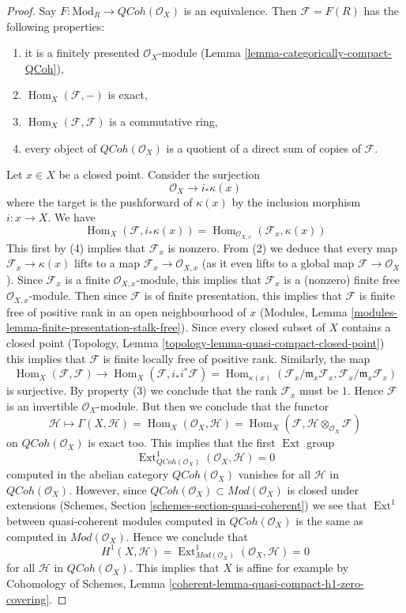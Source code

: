 \documentclass[10pt,a4paper]{amsart}
\theoremstyle{plain}
\theoremstyle{definition}
\theoremstyle{remark}
\numberwithin{equation}{subsection}
\def\Hom{\mathop{\mathrm{Hom}}\nolimits}
\def\Ext{\mathop{\mathrm{Ext}}\nolimits}
\def\QCoh{\mathit{QCoh}}
\begin{document}
\begin{proof}
Say $F : \text{Mod}_R \to \QCoh(\mathcal{O}_X)$ is an equivalence.
Then $\mathcal{F} = F(R)$ has the following properties:
\begin{enumerate}
\item it is a finitely presented $\mathcal{O}_X$-module
(Lemma \ref{lemma-categorically-compact-QCoh}),
\item $\Hom_X(\mathcal{F}, -)$ is exact,
\item $\Hom_X(\mathcal{F}, \mathcal{F})$ is a commutative ring,
\item every object of $\QCoh(\mathcal{O}_X)$ is a quotient of
a direct sum of copies of $\mathcal{F}$.
\end{enumerate}
Let $x \in X$ be a closed point. Consider the surjection
$$
\mathcal{O}_X \to i_*\kappa(x)
$$
where the target is the pushforward of $\kappa(x)$ by the
inclusion morphism $i : x \to X$. We have
$$
\Hom_X(\mathcal{F}, i_*\kappa(x)) =
\Hom_{\mathcal{O}_{X, x}}(\mathcal{F}_x, \kappa(x))
$$
This first by (4) implies that $\mathcal{F}_x$ is nonzero.
From (2) we deduce that every map $\mathcal{F}_x \to \kappa(x)$
lifts to a map $\mathcal{F}_x \to \mathcal{O}_{X, x}$ (as it
even lifts to a global map $\mathcal{F} \to \mathcal{O}_X$).
Since $\mathcal{F}_x$ is a finite $\mathcal{O}_{X, x}$-module,
this implies that $\mathcal{F}_x$ is a (nonzero)
finite free $\mathcal{O}_{X, x}$-module.
Then since $\mathcal{F}$ is of finite presentation, this implies
that $\mathcal{F}$ is finite free of positive rank
in an open neighbourhood of $x$
(Modules, Lemma \ref{modules-lemma-finite-presentation-stalk-free}).
Since every closed subset of $X$ contains a closed point 
(Topology, Lemma \ref{topology-lemma-quasi-compact-closed-point})
this implies that $\mathcal{F}$ is finite locally free of positive rank.
Similarly, the map
$$
\Hom_X(\mathcal{F}, \mathcal{F}) \to
\Hom_X(\mathcal{F}, i_*i^*\mathcal{F}) =
\Hom_{\kappa(x)}(\mathcal{F}_x/\mathfrak m_x \mathcal{F}_x,
\mathcal{F}_x/\mathfrak m_x \mathcal{F}_x)
$$
is surjective. By property (3) we conclude that the rank $\mathcal{F}_x$
must be $1$. Hence $\mathcal{F}$ is an invertible $\mathcal{O}_X$-module.
But then we conclude that the functor
$$
\mathcal{H}
\longmapsto
\Gamma(X, \mathcal{H}) = \Hom_X(\mathcal{O}_X, \mathcal{H}) =
\Hom_X(\mathcal{F}, \mathcal{H} \otimes_{\mathcal{O}_X} \mathcal{F})
$$
on $\QCoh(\mathcal{O}_X)$ is exact too. This implies that the first
$\Ext$ group
$$
\Ext^1_{\QCoh(\mathcal{O}_X)}(\mathcal{O}_X, \mathcal{H}) = 0
$$
computed in the abelian category $\QCoh(\mathcal{O}_X)$ vanishes for all
$\mathcal{H}$ in $\QCoh(\mathcal{O}_X)$. However, since
$\QCoh(\mathcal{O}_X) \subset \textit{Mod}(\mathcal{O}_X)$
is closed under extensions
(Schemes, Section \ref{schemes-section-quasi-coherent})
we see that $\Ext^1$ between quasi-coherent modules
computed in $\QCoh(\mathcal{O}_X)$ is the same as computed
in $\textit{Mod}(\mathcal{O}_X)$. Hence we conclude that
$$
H^1(X, \mathcal{H}) =
\Ext^1_{\textit{Mod}(\mathcal{O}_X)}(\mathcal{O}_X, \mathcal{H}) = 0
$$
for all $\mathcal{H}$ in $\QCoh(\mathcal{O}_X)$.
This implies that $X$ is affine for example by
Cohomology of Schemes, Lemma
\ref{coherent-lemma-quasi-compact-h1-zero-covering}.
\end{proof}
\end{document}

